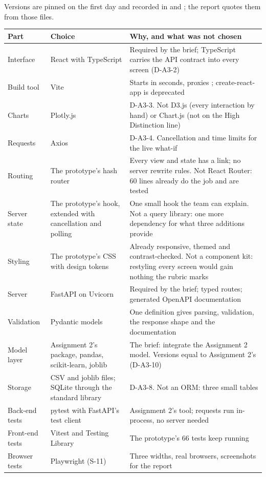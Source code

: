 Versions are pinned on the first day and recorded in  and
; the report quotes them from those files.

{\small
\begin{longtable}{@{}L{2.5cm}L{3.3cm}L{8.2cm}@{}}
\toprule
\textbf{Part} & \textbf{Choice} & \textbf{Why, and what was not chosen} \\
\midrule
\endhead
Interface & React with TypeScript & Required by the brief; TypeScript carries the API contract into every screen (D-A3-2) \\
Build tool & Vite & Starts in seconds, proxies ; create-react-app is deprecated \\
Charts & Plotly.js & D-A3-3. Not D3.js (every interaction by hand) or Chart.js (not on the High Distinction line) \\
Requests & Axios & D-A3-4. Cancellation and time limits for the live what-if \\
Routing & The prototype's hash router & Every view and state has a link; no server rewrite rules. Not React Router: 60 lines already do the job and are tested \\
Server state & The prototype's  hook, extended with cancellation and polling & One small hook the team can explain. Not a query library: one more dependency for what three additions provide \\
Styling & The prototype's CSS with design tokens & Already responsive, themed and contrast-checked. Not a component kit: restyling every screen would gain nothing the rubric marks \\
Server & FastAPI on Uvicorn & Required by the brief; typed routes; generated OpenAPI documentation \\
Validation & Pydantic models & One definition gives parsing, validation, the response shape and the documentation \\
Model layer & Assignment 2's  package, pandas, scikit-learn, joblib & The brief: integrate the Assignment 2 model. Versions equal to Assignment 2's (D-A3-10) \\
Storage & CSV and joblib files; SQLite through the standard library & D-A3-8. Not an ORM: three small tables \\
Back-end tests & pytest with FastAPI's test client & Assignment 2's tool; requests run in-process, no server needed \\
Front-end tests & Vitest and Testing Library & The prototype's 66 tests keep running \\
Browser tests & Playwright (S-11) & Three widths, real browsers, screenshots for the report \\
\bottomrule
\end{longtable}
}


